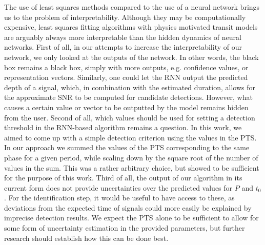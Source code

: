 The use of least squares methods compared to the use of a neural network brings us to the problem of interpretability. Although they may be computationally expensive, least squares fitting algorithms with physics motivated transit models are arguably always more interpretable than the hidden dynamics of neural networks. First of all, in our attempts to increase the interpretability of our network, we only looked at the outputs of the network. In other words, the black box remains a black box, simply with more outputs, e.g. confidence values, or representation vectors. Similarly, one could let the RNN output the predicted depth of a signal, which, in combination with the estimated duration, allows for the approximate SNR to be computed for candidate detections. However, what causes a certain value or vector to be outputted by the model remains hidden from the user. Second of all, which values should be used for setting a detection threshold in the RNN-based algorithm remains a question. In this work, we aimed to come up with a simple detection criterion using the values in the PTS. In our approach we summed the values of the PTS corresponding to the same phase for a given period, while scaling down by the square root of the number of values in the sum. This was a rather arbitrary choice, but showed to be sufficient for the purpose of this work.  Third of all, the output of our algorithm in its current form does not provide uncertainties over the predicted values for $P$ and $t_0$. For the identification step, it would be useful to have access to these, as deviations from the expected time of signals could more easily be explained by imprecise detection results. We expect the PTS alone to be sufficient to allow for some form of uncertainty estimation in the provided parameters, but further research should establish how this can be done best.